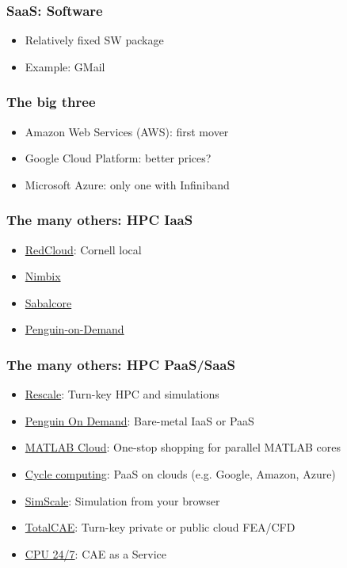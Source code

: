 \documentclass{beamer}
\begin{document}
\begin{frame}
  \frametitle{SaaS: Software}

  \begin{itemize}
  \item Relatively fixed SW package
  \item Example: GMail
  \end{itemize}
\end{frame}

\begin{frame}
  \frametitle{The big three}

  \begin{itemize}
  \item Amazon Web Services (AWS): first mover
  \item Google Cloud Platform: better prices?
  \item Microsoft Azure: only one with Infiniband
  \end{itemize}
\end{frame}

\begin{frame}
  \frametitle{The many others: HPC IaaS}

  \begin{itemize}
  \item \href{https://www.cac.cornell.edu/services/cloudservices.aspx}{RedCloud}: Cornell local
  \item \href{https://www.nimbix.net/}{Nimbix}
  \item \href{http://www.sabalcore.com/}{Sabalcore}
  \item \href{https://pod.penguincomputing.com/hpc_on_demand}{Penguin-on-Demand}
  \end{itemize}
\end{frame}

\begin{frame}
  \frametitle{The many others: HPC PaaS/SaaS}

  \begin{itemize}
  \item \href{http://www.rescale.com/}{Rescale}: Turn-key HPC and simulations
  \item \href{https://pod.penguincomputing.com/}{Penguin On Demand}: Bare-metal IaaS or PaaS
  \item
    \href{https://www.mathworks.com/products/parallel-computing/matlab-parallel-cloud/}{MATLAB
      Cloud}: One-stop shopping for parallel MATLAB cores
  \item \href{https://cyclecomputing.com/}{Cycle computing}: PaaS on clouds (e.g. Google, Amazon, Azure)
  \item \href{https://www.simscale.com/}{SimScale}: Simulation from your browser
  \item \href{https://www.totalcae.com/}{TotalCAE}: Turn-key private or public cloud FEA/CFD
  \item \href{https://www.cpu-24-7.com/}{CPU 24/7}: CAE as a Service
  \end{itemize}
\end{frame}
\end{document}
